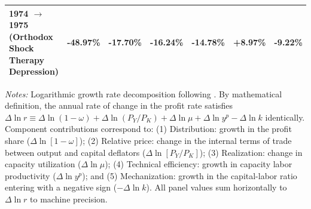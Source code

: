 \begin{table}[htbp]
{\begin{tabular}{lcccccc}
1974 $\to$ 1975 (Orthodox Shock Therapy Depression) & -48.97\% & -17.70\% & -16.24\% & -14.78\% & +8.97\% & -9.22\% \\
\bottomrule
\end{tabular}%
}
\begin{minipage}{0.98\textwidth}
\vspace{0.4em}
\footnotesize
\textit{Notes:} Logarithmic growth rate decomposition following \citet{Weisskopf1979}. By mathematical definition, the annual rate of change in the profit rate satisfies $\Delta \ln r \equiv \Delta \ln(1 - \omega) + \Delta \ln(P_Y / P_K) + \Delta \ln \mu + \Delta \ln y^p - \Delta \ln k$ identically. Component contributions correspond to: (1) Distribution: growth in the profit share ($\Delta \ln[1 - \omega]$); (2) Relative price: change in the internal terms of trade between output and capital deflators ($\Delta \ln[P_Y / P_K]$); (3) Realization: change in capacity utilization ($\Delta \ln \mu$); (4) Technical efficiency: growth in capacity labor productivity ($\Delta \ln y^p$); and (5) Mechanization: growth in the capital-labor ratio entering with a negative sign ($-\Delta \ln k$). All panel values sum horizontally to $\Delta \ln r$ to machine precision.
\end{minipage}
\end{table}
